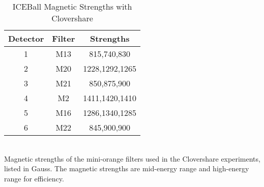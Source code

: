 \begin{table}[]
    \centering
    \caption{ICEBall Magnetic Strengths with Clovershare}
     \label{tab:ICE_Magnet_C}
    \begin{tabular}{c|c|c} \toprule
         Detector & Filter & Strengths \\
         \hline
         1 & M13 & 815,740,830 \\ 
         2 & M20 & 1228,1292,1265\\
         3 & M21 & 850,875,900 \\
         4 & M2 & 1411,1420,1410\\
         5 & M16 & 1286,1340,1285\\
         6 & M22 & 845,900,900\\ \bottomrule
    \end{tabular}
    \\[2pt]
    \footnotesize
    Magnetic strengths of the mini-orange filters used in the Clovershare experiments, listed in Gauss. The magnetic strengths are mid-energy range and high-energy range for efficiency.
\end{table}